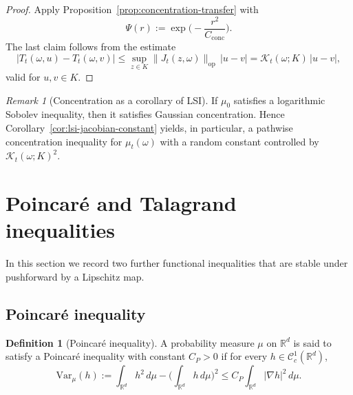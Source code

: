 \documentclass{tsp-short}
\theoremstyle{remark}
\newtheorem{remark}{Remark}[section]
\theoremstyle{definition}
\newtheorem{definition}{Definition}[section]
\begin{document}
\begin{proof}
Apply Proposition~\ref{prop:concentration-transfer} with
\begin{equation*}
\Psi(r):=\exp\Big(-\frac{r^2}{C_{\mathrm{conc}}}\Big).
\end{equation*}
The last claim follows from the estimate
\begin{equation*}
|T_t(\omega,u)-T_t(\omega,v)|
\le
\sup_{z\in K}\|J_t(z,\omega)\|_{\mathrm{op}}\,|u-v|
=
\mathcal K_t(\omega;K)\,|u-v|,
\end{equation*}
valid for $u,v\in K$.
\end{proof}

\begin{remark}[Concentration as a corollary of LSI]
If $\mu_0$ satisfies a logarithmic Sobolev inequality, then it satisfies Gaussian concentration.
Hence Corollary~\ref{cor:lsi-jacobian-constant} yields, in particular, a pathwise concentration inequality for $\mu_t(\omega)$ with a random constant controlled by $\mathcal K_t(\omega;K)^2$.
\end{remark}



\section{Poincar\'e and Talagrand inequalities}\label{sec:poincare-talagrand}

In this section we record two further functional inequalities that are stable under pushforward by a Lipschitz map.

\subsection{Poincar\'e inequality}

\begin{definition}[Poincar\'e inequality]
A probability measure $\mu$ on $\mathbb{R}^d$ is said to satisfy a Poincar\'e inequality with constant $C_P>0$ if for every $h\in \mathcal C_c^1(\mathbb{R}^d)$,
\begin{equation}
\mathrm{Var}_\mu(h):=\int_{\mathbb{R}^d} h^2\,d\mu-\Big(\int_{\mathbb{R}^d} h\,d\mu\Big)^2
\le
C_P\int_{\mathbb{R}^d} |\nabla h|^2\,d\mu.
\label{eq:poincare-def}
\end{equation}
\end{definition}
\end{document}
